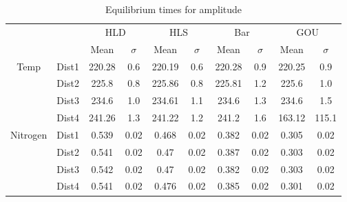 \begin{table}[h]
\centering
\caption{Equilibrium times for amplitude}
\label{table:5}
\begin{tabular}{cccccccccc}
\toprule
 &  & \multicolumn{2}{c}{HLD} & \multicolumn{2}{c}{HLS} & \multicolumn{2}{c}{Bar} & \multicolumn{2}{c}{GOU} \\
 &  & Mean & $\sigma$ & Mean & $\sigma$ & Mean & $\sigma$ & Mean & $\sigma$ \\
\midrule
\multirow[c]{4}{*}{Temp} & Dist1 & 220.28 & 0.6 & 220.19 & 0.6 & 220.28 & 0.9 & 220.25 & 0.9 \\
 & Dist2 & 225.8 & 0.8 & 225.86 & 0.8 & 225.81 & 1.2 & 225.6 & 1.0 \\
 & Dist3 & 234.6 & 1.0 & 234.61 & 1.1 & 234.6 & 1.3 & 234.6 & 1.5 \\
 & Dist4 & 241.26 & 1.3 & 241.22 & 1.2 & 241.2 & 1.6 & 163.12 & 115.1 \\
\multirow[c]{4}{*}{Nitrogen} & Dist1 & 0.539 & 0.02 & 0.468 & 0.02 & 0.382 & 0.02 & 0.305 & 0.02 \\
 & Dist2 & 0.541 & 0.02 & 0.47 & 0.02 & 0.387 & 0.02 & 0.303 & 0.02 \\
 & Dist3 & 0.542 & 0.02 & 0.47 & 0.02 & 0.382 & 0.02 & 0.303 & 0.02 \\
 & Dist4 & 0.541 & 0.02 & 0.476 & 0.02 & 0.385 & 0.02 & 0.301 & 0.02 \\
\bottomrule
\end{tabular}
\end{table}
